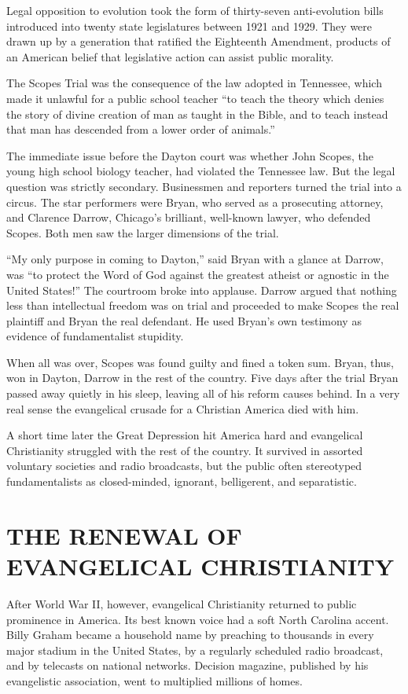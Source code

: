 Legal opposition to evolution took the form of thirty-seven anti-evolution bills introduced into
twenty state legislatures between 1921 and 1929. They were drawn up by a generation that ratified
the Eighteenth Amendment, products of an American belief that legislative action can assist public
morality.

The Scopes Trial was the consequence of the law adopted in Tennessee, which made it unlawful for a
public school teacher “to teach the theory which denies the story of divine creation of man as
taught in the Bible, and to teach instead that man has descended from a lower order of animals.”

The immediate issue before the Dayton court was whether John Scopes, the young high school biology
teacher, had violated the Tennessee law. But the legal question was strictly secondary. Businessmen
and reporters turned the trial into a circus. The star performers were Bryan, who served as a
prosecuting attorney, and Clarence Darrow, Chicago’s brilliant, well-known lawyer, who defended
Scopes. Both men saw the larger dimensions of the trial.

“My only purpose in coming to Dayton,” said Bryan with a glance at Darrow, was “to protect the Word
of God against the greatest atheist or agnostic in the United States!” The courtroom broke into
applause. Darrow argued that nothing less than intellectual freedom was on trial and proceeded to
make Scopes the real plaintiff and Bryan the real defendant. He used Bryan’s own testimony as
evidence of fundamentalist stupidity.

When all was over, Scopes was found guilty and fined a token sum. Bryan, thus, won in Dayton, Darrow
in the rest of the country. Five days after the trial Bryan passed away quietly in his sleep,
leaving all of his reform causes behind. In a very real sense the evangelical crusade for a
Christian America died with him.

A short time later the Great Depression hit America hard and evangelical Christianity struggled with
the rest of the country. It survived in assorted voluntary societies and radio broadcasts, but the
public often stereotyped fundamentalists as closed-minded, ignorant, belligerent, and separatistic.

\section{THE RENEWAL OF EVANGELICAL CHRISTIANITY}

After World War II, however, evangelical Christianity returned to public prominence in America. Its
best known voice had a soft North Carolina accent. Billy Graham became a household name by preaching
to thousands in every major stadium in the United States, by a regularly scheduled radio broadcast,
and by telecasts on national networks. Decision magazine, published by his evangelistic association,
went to multiplied millions of homes.

